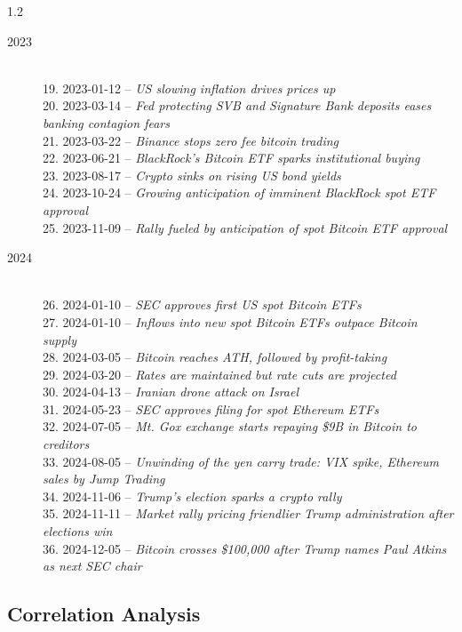 \documentclass[10pt]{article}
\begin{document}
\begin{setstretch}{1.2}
\begin{description}
    \item [2023] \hfill \\ 19. 2023-01-12 -- \textit{US slowing inflation drives prices up} \\ 20. 2023-03-14 -- \textit{Fed protecting SVB and Signature Bank deposits eases banking contagion fears} \\ 21. 2023-03-22 -- \textit{Binance stops zero fee bitcoin trading} \\ 22. 2023-06-21 -- \textit{BlackRock's Bitcoin ETF sparks institutional buying} \\ 23. 2023-08-17 -- \textit{Crypto sinks on rising US bond yields} \\ 24. 2023-10-24 -- \textit{Growing anticipation of imminent BlackRock spot ETF approval} \\ 25. 2023-11-09 -- \textit{Rally fueled by anticipation of spot Bitcoin ETF approval}
    
    \item [2024] \hfill \\ 26. 2024-01-10 -- \textit{SEC approves first US spot Bitcoin ETFs} \\ 27. 2024-01-10 -- \textit{Inflows into new spot Bitcoin ETFs outpace Bitcoin supply} \\ 28. 2024-03-05 -- \textit{Bitcoin reaches ATH, followed by profit-taking} \\ 29. 2024-03-20 -- \textit{Rates are maintained but rate cuts are projected} \\ 30. 2024-04-13 -- \textit{Iranian drone attack on Israel} \\ 31. 2024-05-23 -- \textit{SEC approves filing for spot Ethereum ETFs} \\ 32. 2024-07-05 -- \textit{Mt. Gox exchange starts repaying \$9B in Bitcoin to creditors} \\ 33. 2024-08-05 -- \textit{Unwinding of the yen carry trade: VIX spike, Ethereum sales by Jump Trading} \\ 34. 2024-11-06 -- \textit{Trump's election sparks a crypto rally} \\ 35. 2024-11-11 -- \textit{Market rally pricing friendlier Trump administration after elections win} \\ 36. 2024-12-05 -- \textit{Bitcoin crosses \$100,000 after Trump names Paul Atkins as next SEC chair}
    
\end{description} 

    \subsection{Correlation Analysis}
    \label{sec:appendixHeatmap}


\end{setstretch}
\end{document}
